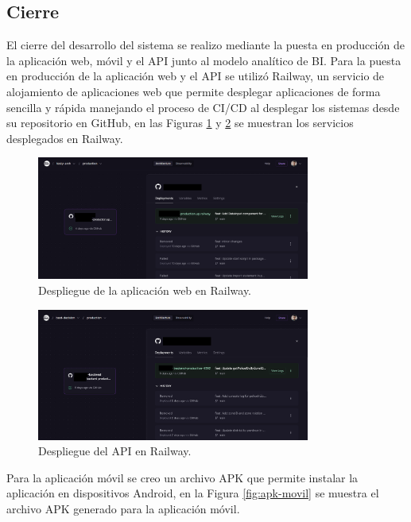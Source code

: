 \subsection{Cierre}
El cierre del desarrollo del sistema se realizo mediante la puesta en producción de la aplicación web, móvil y el API junto al modelo analítico
de BI. Para la puesta en producción de la aplicación web y el API se utilizó Railway, un servicio de alojamiento de aplicaciones web que permite
desplegar aplicaciones de forma sencilla y rápida manejando el proceso de CI/CD al desplegar los sistemas desde su repositorio en GitHub, en las
Figuras \ref{fig:despliegue-web} y \ref{fig:despliegue-api} se muestran los servicios desplegados en Railway.

\begin{figure}[H]
    \centering
    \includegraphics[width=0.8\textwidth]{chapters/III-resultados-y-discusion/resources/images/despliegue-web.png}
    \caption{Despliegue de la aplicación web en Railway.}
    \label{fig:despliegue-web}
\end{figure}

\begin{figure}[H]
    \centering
    \includegraphics[width=0.8\textwidth]{chapters/III-resultados-y-discusion/resources/images/despliegue-api.png}
    \caption{Despliegue del API en Railway.}
    \label{fig:despliegue-api}
\end{figure}

Para la aplicación móvil se creo un archivo APK que permite instalar la aplicación en dispositivos Android, en la Figura \ref{fig:apk-movil}
se muestra el archivo APK generado para la aplicación móvil.

